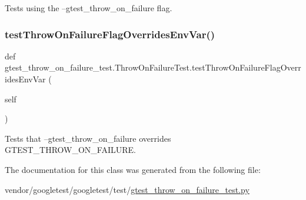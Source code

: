 \begin{DoxyVerb}Tests using the --gtest_throw_on_failure flag.\end{DoxyVerb}
 \mbox{\label{classgtest__throw__on__failure__test_1_1_throw_on_failure_test_ab63f8f491aeaaa04ba3fc7ae3bca6de8}} 
\subsubsection{\texorpdfstring{test\+Throw\+On\+Failure\+Flag\+Overrides\+Env\+Var()}{testThrowOnFailureFlagOverridesEnvVar()}}
{\footnotesize\ttfamily def gtest\+\_\+throw\+\_\+on\+\_\+failure\+\_\+test.\+Throw\+On\+Failure\+Test.\+test\+Throw\+On\+Failure\+Flag\+Overrides\+Env\+Var (\begin{DoxyParamCaption}\item[{}]{self }\end{DoxyParamCaption})}

\begin{DoxyVerb}Tests that --gtest_throw_on_failure overrides GTEST_THROW_ON_FAILURE.\end{DoxyVerb}
 

The documentation for this class was generated from the following file\+:\begin{DoxyCompactItemize}
\item 
vendor/googletest/googletest/test/\hyperlink{gtest__throw__on__failure__test_8py}{gtest\+\_\+throw\+\_\+on\+\_\+failure\+\_\+test.\+py}\end{DoxyCompactItemize}
